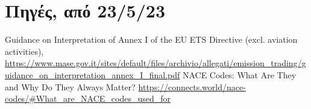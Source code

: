 \documentclass[a4paper,twoside,10pt]{article}
\begin{document}
\section{Πηγές, από 23/5/23}
\begin{thebibliography}{999}
	
	Guidance on Interpretation of Annex I of the EU ETS Directive (excl. aviation activities),
	\url{https://www.mase.gov.it/sites/default/files/archivio/allegati/emission_trading/guidance_on_interpretation_annex_I_final.pdf}
	NACE Codes: What Are They and Why Do They Always Matter?
	\url{https://connects.world/nace-codes/#What_are_NACE_codes_used_for}
	
\end{thebibliography}
\end{document}
